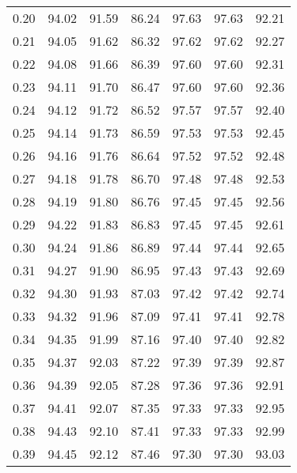 \begin{tabular}{|c|c|c|c|c|c|c|}
      0.20 &     94.02 &     91.59 &      86.24 &   97.63 &      97.63 &         92.21 \\
      0.21 &     94.05 &     91.62 &      86.32 &   97.62 &      97.62 &         92.27 \\
      0.22 &     94.08 &     91.66 &      86.39 &   97.60 &      97.60 &         92.31 \\
      0.23 &     94.11 &     91.70 &      86.47 &   97.60 &      97.60 &         92.36 \\
      0.24 &     94.12 &     91.72 &      86.52 &   97.57 &      97.57 &         92.40 \\
      0.25 &     94.14 &     91.73 &      86.59 &   97.53 &      97.53 &         92.45 \\
      0.26 &     94.16 &     91.76 &      86.64 &   97.52 &      97.52 &         92.48 \\
      0.27 &     94.18 &     91.78 &      86.70 &   97.48 &      97.48 &         92.53 \\
      0.28 &     94.19 &     91.80 &      86.76 &   97.45 &      97.45 &         92.56 \\
      0.29 &     94.22 &     91.83 &      86.83 &   97.45 &      97.45 &         92.61 \\
      0.30 &     94.24 &     91.86 &      86.89 &   97.44 &      97.44 &         92.65 \\
      0.31 &     94.27 &     91.90 &      86.95 &   97.43 &      97.43 &         92.69 \\
      0.32 &     94.30 &     91.93 &      87.03 &   97.42 &      97.42 &         92.74 \\
      0.33 &     94.32 &     91.96 &      87.09 &   97.41 &      97.41 &         92.78 \\
      0.34 &     94.35 &     91.99 &      87.16 &   97.40 &      97.40 &         92.82 \\
      0.35 &     94.37 &     92.03 &      87.22 &   97.39 &      97.39 &         92.87 \\
      0.36 &     94.39 &     92.05 &      87.28 &   97.36 &      97.36 &         92.91 \\
      0.37 &     94.41 &     92.07 &      87.35 &   97.33 &      97.33 &         92.95 \\
      0.38 &     94.43 &     92.10 &      87.41 &   97.33 &      97.33 &         92.99 \\
      0.39 &     94.45 &     92.12 &      87.46 &   97.30 &      97.30 &         93.03 \\

\end{tabular}
